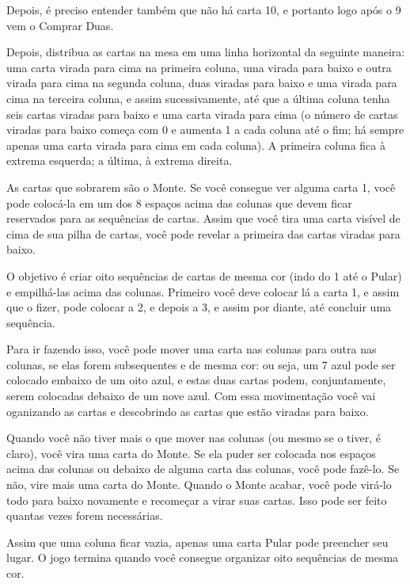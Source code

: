 Depois, é preciso entender também que não há carta 10, e portanto logo após o 9 vem o Comprar Duas.

Depois, distribua as cartas na mesa em uma linha horizontal da seguinte maneira: uma carta virada para cima na primeira coluna, uma virada para baixo e outra virada para cima na segunda coluna, duas viradas para baixo e uma virada para cima na terceira coluna, e assim sucessivamente, até que a última coluna tenha seis cartas viradas para baixo e uma carta virada para cima (o número de cartas viradas para baixo começa com 0 e aumenta 1 a cada coluna até o fim; há sempre apenas uma carta virada para cima em cada coluna). A primeira coluna fica à extrema esquerda; a última, à extrema direita.

As cartas que sobrarem são o Monte. Se você consegue ver alguma carta 1, você pode colocá-la em um dos 8 espaços acima das colunas que devem ficar reservados para as sequências de cartas. Assim que você tira uma carta visível de cima de sua pilha de cartas, você pode revelar a primeira das cartas viradas para baixo.

O objetivo é criar oito sequências de cartas de mesma cor (indo do 1 até o Pular) e empilhá-las acima das colunas. Primeiro você deve colocar lá a carta 1, e assim que o fizer, pode colocar a 2, e depois a 3, e assim por diante, até concluir uma sequência.

Para ir fazendo isso, você pode mover uma carta nas colunas para outra nas colunas, se elas forem subsequentes e de mesma cor: ou seja, um 7 azul pode ser colocado embaixo de um oito azul, e estas duas cartas podem, conjuntamente, serem colocadas debaixo de um nove azul. Com essa movimentação você vai oganizando as cartas e descobrindo as cartas que estão viradas para baixo.

Quando você não tiver mais o que mover nas colunas (ou mesmo se o tiver, é claro), você vira uma carta do Monte. Se ela puder ser colocada nos espaços acima das colunas ou debaixo de alguma carta das colunas, você pode fazê-lo. Se não, vire mais uma carta do Monte. Quando o Monte acabar, você pode virá-lo todo para baixo novamente e recomeçar a virar suas cartas. Isso pode ser feito quantas vezes forem necessárias.

Assim que uma coluna ficar vazia, apenas uma carta Pular pode preencher seu lugar. O jogo termina quando você consegue organizar oito sequências de mesma cor.
